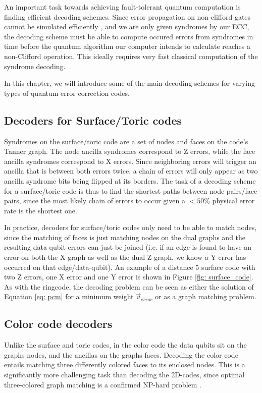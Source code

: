An important task towards achieving fault-tolerant quantum computation is
finding efficient decoding schemes.
Since error propagation on non-clifford gates cannot be simulated efficiently
\cite{gottesmanFaultTolerant}, and we are only given syndromes by our ECC,
the decoding scheme must be able to compute occured 
errors from syndromes in time before the quantum algorithm our computer intends 
to calculate reaches a non-Clifford operation. This ideally requires very fast 
classical computation of the syndrome decoding.

In this chapter, we will introduce some of the main decoding schemes for
varying types of quantum error correction codes.

\subsection{Decoders for Surface/Toric codes}
Syndromes on the surface/toric code are a set of nodes and
faces on the code's Tanner graph. The node ancilla syndromes correspond to
Z errors, while the face ancilla syndromes correspond to X errors.
Since neighboring errors will trigger an ancilla that is between 
both errors twice, a chain of errors will only appear as two ancilla
syndrome bits being flipped at its borders.
The task of a decoding scheme for a surface/toric code is thus to
find the shortest paths between node pairs/face pairs, since the most likely
chain of errors to occur given a $<50\%$ physical error rate is the 
shortest one.

In practice, decoders for surface/toric codes only need to be able to
match nodes, since the matching of faces is just matching nodes on the 
dual graphs and the resulting data qubit errors can just be joined
(i.e. if an edge is found to have an error on both the X graph as well as the
dual Z graph, we know a Y error has occurred on that edge/data-qubit).
An example of a distance 5 surface code with two Z errors, one X error and
one Y error is shown in Figure \ref{fig: surface_code}.
As with the ringcode, the decoding problem can be seen as either the
solution of Equation \ref{eq: pcm} for a minimum weight $\vec{v}_{error}$
or as a graph matching problem.



\subsection{Color code decoders}
Unlike the surface and toric codes, in the color code the 
data qubits sit on the graphs nodes, and the ancillas on the 
graphs faces. Decoding the color code entails matching 
three differently colored faces to its enclosed nodes.
This is a significantly more challenging task than
decoding the 2D-codes, since optimal three-colored graph matching 
is a confirmed NP-hard problem \cite{delfosse}.

